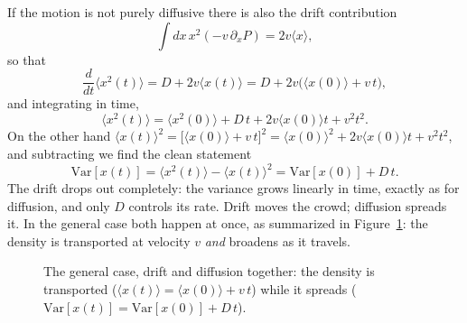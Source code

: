 If the motion is not purely diffusive there is also the drift contribution
\[
\int dx\,x^2(-v\,\partial_x P)=2v\langle x\rangle,
\]
so that
\begin{equation}
\frac{d}{dt}\langle x^2(t)\rangle = D + 2v\langle x(t)\rangle = D + 2v\big(\langle x(0)\rangle + v\,t\big),
\end{equation}
and integrating in time,
\begin{equation}
\langle x^2(t)\rangle = \langle x^2(0)\rangle + D\,t + 2v\langle x(0)\rangle t + v^2 t^2.
\end{equation}
On the other hand $\langle x(t)\rangle^2 = \big[\langle x(0)\rangle + v\,t\big]^2 = \langle x(0)\rangle^2 + 2v\langle x(0)\rangle t + v^2 t^2$, and subtracting we find the clean statement
\begin{equation}
\mathrm{Var}[x(t)] = \langle x^2(t)\rangle - \langle x(t)\rangle^2 = \mathrm{Var}[x(0)] + D\,t.
\end{equation}
The drift drops out completely: the variance grows linearly in time, exactly as for diffusion, and only $D$ controls its rate.
Drift moves the crowd; diffusion spreads it.
In the general case both happen at once, as summarized in Figure~\ref{fig:drift-diffusion}: the density is transported at velocity $v$ \emph{and} broadens as it travels.

\begin{figure}[h!]
\centering
{}
\caption{The general case, drift and diffusion together: the density is transported ($\langle x(t)\rangle = \langle x(0)\rangle + v\,t$) while it spreads ($\mathrm{Var}[x(t)] = \mathrm{Var}[x(0)] + D\,t$).}
\label{fig:drift-diffusion}
\end{figure}

